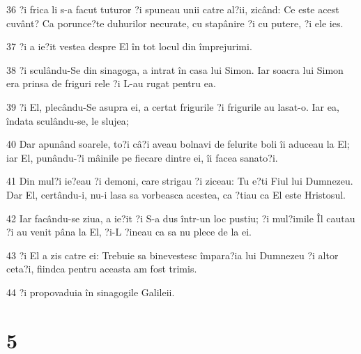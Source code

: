\par 36 ?i frica li s-a facut tuturor ?i spuneau unii catre al?ii, zicând: Ce este acest cuvânt? Ca porunce?te duhurilor necurate, cu stapânire ?i cu putere, ?i ele ies.
\par 37 ?i a ie?it vestea despre El în tot locul din împrejurimi.
\par 38 ?i sculându-Se din sinagoga, a intrat în casa lui Simon. Iar soacra lui Simon era prinsa de friguri rele ?i L-au rugat pentru ea.
\par 39 ?i El, plecându-Se asupra ei, a certat frigurile ?i frigurile au lasat-o. Iar ea, îndata sculându-se, le slujea;
\par 40 Dar apunând soarele, to?i câ?i aveau bolnavi de felurite boli îi aduceau la El; iar El, punându-?i mâinile pe fiecare dintre ei, îi facea sanato?i.
\par 41 Din mul?i ie?eau ?i demoni, care strigau ?i ziceau: Tu e?ti Fiul lui Dumnezeu. Dar El, certându-i, nu-i lasa sa vorbeasca acestea, ca ?tiau ca El este Hristosul.
\par 42 Iar facându-se ziua, a ie?it ?i S-a dus într-un loc pustiu; ?i mul?imile Îl cautau ?i au venit pâna la El, ?i-L ?ineau ca sa nu plece de la ei.
\par 43 ?i El a zis catre ei: Trebuie sa binevestesc împara?ia lui Dumnezeu ?i altor ceta?i, fiindca pentru aceasta am fost trimis.
\par 44 ?i propovaduia în sinagogile Galileii.

\chapter{5}

